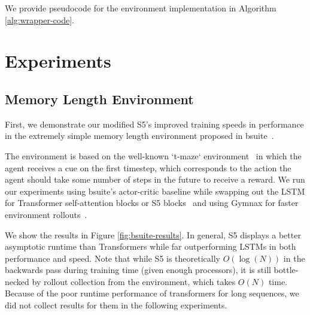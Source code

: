 \documentclass{article}
\begin{document}
We provide pseudocode for the environment implementation in Algorithm \ref{alg:wrapper-code}.

\section{Experiments}
\label{sec:Results}


\subsection{Memory Length Environment}
\label{subsec:bsuite-results}

 First, we demonstrate our modified S5's improved training speeds in performance in the extremely simple memory length environment proposed in bsuite~\citep{osband2019behaviour}. 
 
 The environment is based on the well-known `t-maze` environment~\citep{o1971hippocampus} in which the agent receives a cue on the first timestep, which corresponds to the action the agent should take some number of steps in the future to receive a reward. We run our experiments using bsuite's actor-critic baseline while swapping out the LSTM for Transformer self-attention blocks or S5 blocks~\citep{vaswani2017attention} and using Gymnax for faster environment rollouts~\citep{gymnax2022github}. 

We show the results in Figure \ref{fig:bsuite-results}. In general, S5 displays a better asymptotic runtime than Transformers while far outperforming LSTMs in both performance and speed. Note that while S5 is theoretically $O(\log(N))$ in the backwards pass during training time (given enough processors), it is still bottle-necked by rollout collection from the environment, which takes $O(N)$ time. Because of the poor runtime performance of transformers for long sequences, we did not collect results for them in the following experiments.
\end{document}
